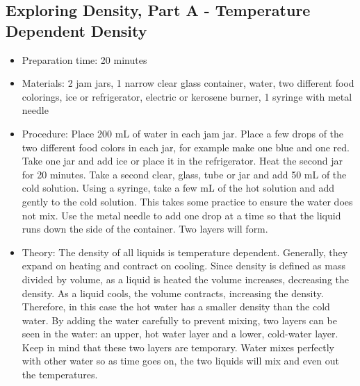 \subsection{Exploring Density, Part A - Temperature Dependent Density}
\begin{itemize}
\item{Preparation time: 20 minutes}
\item{Materials: 2 jam jars, 1 narrow clear glass container, water, two different food colorings, ice or refrigerator, electric or kerosene burner, 1 syringe with metal needle}
\item{Procedure: Place 200 mL of water in each jam jar. Place a few drops of the two different food colors in each jar, for example make one blue and one red. Take one jar and add ice or place it in the refrigerator. Heat the second jar for 20 minutes. Take a second clear, glass, tube or jar and add 50 mL of the cold solution. Using a syringe, take a few mL of the hot solution and add gently to the cold solution. This takes some practice to ensure the water does not mix. Use the metal needle to add one drop at a time so that the liquid runs down the side of the container. Two layers will form. }
\item{Theory: The density of all liquids is temperature dependent. Generally, they expand on heating and contract on cooling. Since density is defined as mass divided by volume, as a liquid is heated the volume increases, decreasing the density. As a liquid cools, the volume contracts, increasing the density. Therefore, in this case the hot water has a smaller density than the cold water. By adding the water carefully to prevent mixing, two layers can be seen in the water: an upper, hot water layer and a lower, cold-water layer. Keep in mind that these two layers are temporary. Water mixes perfectly with other water so as time goes on, the two liquids will mix and even out the temperatures.}
\end{itemize}

